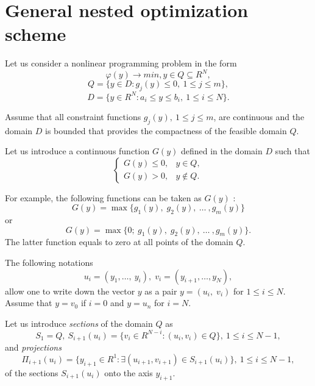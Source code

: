 \section{General nested optimization scheme}
\label{sec:5_1}
Let us consider a nonlinear programming problem in the form 
\begin{equation}
\label{eq:5_1}
\varphi(y)\rightarrow min,y\in Q\subseteq R^N,
\end{equation}
\begin{equation}
\label{eq:5_2}
Q=\{y\in D:g_j(y)\leq 0,\:1\leq j\leq m\},
\end{equation}
\begin{equation}
\label{eq:5_3}
D=\{y\in R^N:a_i\leq y\leq b_i,\:1\leq i\leq N\}.
\end{equation}

Assume that all constraint functions $g_j(y),\:1\leq j\leq m$,  are continuous and the domain $D$  is  bounded that provides the compactness of the feasible domain $Q$. 

Let us introduce a continuous function $G(y)$  defined in the domain $D$  such that
\begin{equation}
\label{eq:5_4}
  \begin{cases}
    G(y)\leq 0, & y\in Q, \\
    G(y)>0, & y\notin Q.
  \end{cases}
\end{equation}

For example, the following functions can be taken as $G(y)$ :
\begin{equation}
\label{eq:5_5}
G(y)=\max\{g_1(y),\;g_2(y),\:\ldots\:,g_m(y)\}
\end{equation}
or
\begin{equation}
\label{eq:5_6}
G(y)=\max\{0;\:g_1(y),\;g_2(y),\:\ldots\:,g_m(y)\}.
\end{equation}
The latter function equals to zero at all points of the domain $Q$.

The following notations
\begin{equation}
\label{eq:5_7}
u_i=(y_1,\ldots,\:y_i),\;v_i=(y_{i+1},\ldots,y_N),
\end{equation}
allow one to write down the vector $y$ as a pair $y=(u_i,\;v_i)$  for $1\leq i\leq N$. Assume that $y=v_0$  if $i=0$  and $y=u_n$  for $i=N$.

Let us introduce  \textit{sections} of the domain $Q$ as
\begin{equation}
\label{eq:5_8}
S_1=Q,\ S_{i+1}(u_i)=\{v_i\in R^{N-i}:(u_i,v_i)\in Q\},\:1\leq i\leq N-1,
\end{equation}
and \textit{projections}
\begin{equation}
\label{eq:5_9}
\Pi_{i+1}(u_i)=\{y_{i+1}\in R^1:\exists (u_{i+1},v_{i+1})\in S_{i+1}(u_i)\},\:1\leq i\leq N-1,
\end{equation}
of the sections $S_{i+1}(u_i)$ onto the axis $y_{i+1}$.

